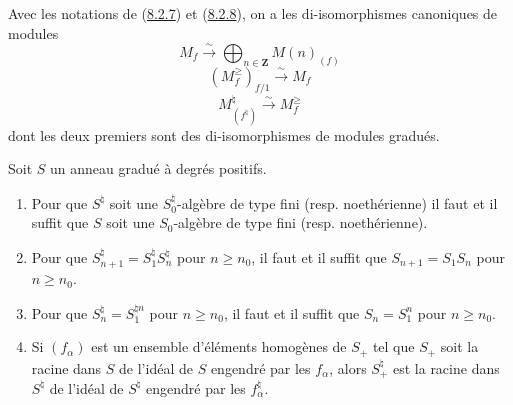 \begin{lemma}[8.2.9]
\label{II.8.2.9-fr}
Avec les notations de (\hyperref[II.8.2.7-fr]{8.2.7}) et
(\hyperref[II.8.2.8-fr]{8.2.8}), on a les di-isomorphismes canoniques de
modules
\begin{equation}
\label{II.8.2.9.1-fr}
  M_f\xrightarrow{\sim}\bigoplus_{n\in\mathbf{Z}}M(n)_{(f)}
\tag{8.2.9.1}
\end{equation}
\begin{equation}
\label{II.8.2.9.2-fr}
  (M_f^{\geq})_{f/1}\xrightarrow{\sim}M_f
\tag{8.2.9.2}
\end{equation}
\begin{equation}
\label{II.8.2.9.3-fr}
  M^\natural_{(f^\natural)}\xrightarrow{\sim}M_f^{\geq}
\tag{8.2.9.3}
\end{equation}
dont les deux premiers sont des di-isomorphismes de modules gradués.
\end{lemma}

\begin{lemma}[8.2.10]
\label{II.8.2.10-fr}
Soit $S$ un anneau gradué à degrés positifs.
\begin{enumerate}
\item[\rm(i)] Pour que $S^\natural$ soit une $S_0^\natural$-algèbre de type
fini (resp. noethérienne) il faut et il suffit que $S$ soit une $S_0$-algèbre
de type fini (resp. noethérienne).
\item[\rm(ii)] Pour que $S_{n+1}^\natural=S_1^\natural S_n^\natural$ pour
$n\geq n_0$, il faut et il suffit que $S_{n+1}=S_1S_n$ pour $n\geq n_0$.
\item[\rm(iii)] Pour que $S_n^\natural=S_1^{\natural n}$ pour $n\geq n_0$, il
faut et il suffit que $S_n=S_1^n$ pour $n\geq n_0$.
\item[\rm(iv)] Si $(f_\alpha)$ est un ensemble d'éléments homogènes de $S_+$
tel que $S_+$ soit la racine dans $S$ de l'idéal de $S$ engendré par
les $f_\alpha$, alors $S_+^\natural$ est la racine dans $S^\natural$ de
l'idéal de $S^\natural$ engendré par les $f_\alpha^\natural$.
\end{enumerate}
\end{lemma}

